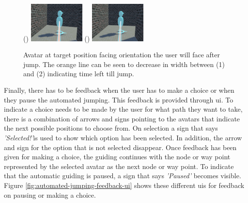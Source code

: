 \begin{figure}[]
	\centering
	() {\includegraphics[width=0.25\textwidth]{images/automated-jumping-feedback-1.pdf}}
	() {\includegraphics[width=0.25\textwidth]{images/automated-jumping-feedback-2.pdf}} 
	\caption{Avatar at target position facing orientation the user will face after jump. The orange line can be seen to decrease in width between (1) and (2) indicating time left till jump.}
	\label{fig:automated-jumping-feedback}
\end{figure}  

Finally, there has to be feedback  when the user has to make a choice or when they pause the automated jumping. This feedback is provided through \acrfull{ui}. To indicate a choice needs to be made by the user for what path they want to take, there is a combination of arrows and signs pointing to the avatars that indicate the next possible positions to choose from. On selection a sign that says \textit{'Selected!'}is used to show which option has been selected. In addition, the arrow and sign for the option that is not selected disappear. Once feedback has been given for making a choice, the guiding continues with the node or way point represented by the selected avatar as the next node or way point. To indicate that the automatic guiding is paused, a sign that says \textit{'Paused'} becomes visible. Figure \ref{fig:automated-jumping-feedback-ui} shows these different \acrshort{ui}s for feedback on pausing or making a choice. 

